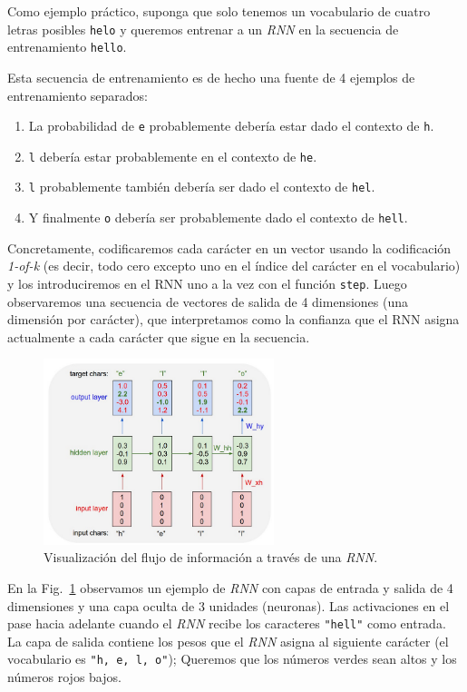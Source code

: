 \documentclass[a4paper,12pt]{article}
\begin{document}
Como ejemplo práctico, suponga que solo tenemos un vocabulario de cuatro letras posibles \texttt{helo} y queremos entrenar a un \textit{RNN} en la secuencia de entrenamiento \texttt{hello}. 

Esta secuencia de entrenamiento es de hecho una fuente de 4 ejemplos de entrenamiento separados: 
\begin{enumerate}[noitemsep, topsep=2pt]
	\item La probabilidad de \texttt{e} probablemente debería estar dado el contexto de \texttt{h}.
	\item \texttt{l} debería estar probablemente en el contexto de \texttt{he}.
	\item \texttt{l} probablemente también debería ser dado el contexto de \texttt{hel}.
	\item  Y finalmente \texttt{o} debería ser probablemente dado el contexto de \texttt{hell}.
\end{enumerate}

Concretamente, codificaremos cada carácter en un vector usando la codificación \textit{1-of-k} (es decir, todo cero excepto uno en el índice del carácter en el vocabulario) y los introduciremos en el RNN uno a la vez con el función \texttt{step}. Luego observaremos una secuencia de vectores de salida de 4 dimensiones (una dimensión por carácter), que interpretamos como la confianza que el RNN asigna actualmente a cada carácter que sigue en la secuencia. 

\begin{figure}[H]
	\begin{center}				
		\includegraphics[width=0.6\textwidth]{tesis_29.png}
		\caption{Visualización del flujo de información a través de una \textit{RNN}. \citep{karpathy:rnn}}
		\label{fig:rnnexample}
	\end{center}
\end{figure}

En la Fig.~\ref{fig:rnnexample} observamos un ejemplo de \textit{RNN} con capas de entrada y salida de 4 dimensiones y una capa oculta de 3 unidades (neuronas). Las activaciones en el pase hacia adelante cuando el \textit{RNN} recibe los caracteres \texttt{"hell"} como entrada. La capa de salida contiene los pesos que el \textit{RNN} asigna al siguiente carácter (el vocabulario es \texttt{"h, e, l, o"}); Queremos que los números verdes sean altos y los números rojos bajos.
\end{document}
